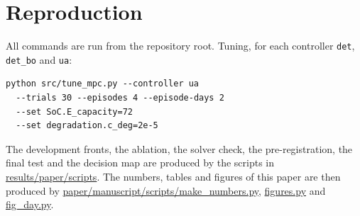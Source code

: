 \documentclass[a4paper,fleqn]{cas-dc}
\begin{document}
\section{Reproduction}\label{app:repro}
All commands are run from the repository root. Tuning, for each controller \texttt{det}, \texttt{det\_bo} and \texttt{ua}:
\begin{verbatim}
python src/tune_mpc.py --controller ua
  --trials 30 --episodes 4 --episode-days 2
  --set SoC.E_capacity=72
  --set degradation.c_deg=2e-5
\end{verbatim}
The development fronts, the ablation, the solver check, the pre-registration, the final test and the decision map are produced by the scripts in \url{results/paper/scripts}. The numbers, tables and figures of this paper are then produced by \url{paper/manuscript/scripts/make_numbers.py}, \url{figures.py} and \url{fig_day.py}.



\end{document}
